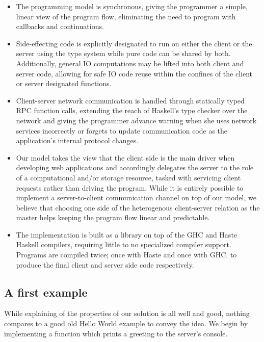 \documentclass[preprint]{sigplanconf}
\begin{document}
\begin{itemize}
  \item The programming model is synchronous, giving the programmer a simple,
        linear view of the program flow, eliminating the need to program with
        callbacks and continuations.
  \item Side-effecting code is explicitly designated to run on either the
        client or the server using the type system while pure code can be
        shared by both. Additionally, general IO computations may be lifted
        into both client and server code, allowing for safe IO code reuse
        within the confines of the client or server designated functions.
  \item Client-server network communication is handled through statically typed
        RPC function calls, extending the reach of Haskell's type checker over
        the network and giving the programmer advance warning when she uses
        network services incorrectly or forgets to update communication code
        as the application's internal protocol changes.
  \item Our model takes the view that the client side is the main driver when
        developing web applications and accordingly delegates the server to
        the role of a computational and/or storage resource, tasked with
        servicing client requests rather than driving the program. While it is
        entirely possible to implement a server-to-client communication channel
        on top of our model, we believe that choosing one side of the
        heterogenous client-server relation as the master helps keeping the
        program flow linear and predictable.
  \item The implementation is built as a library on top of the GHC and Haste
        Haskell compilers, requiring little to no specialized compiler support.
        Programs are compiled twice; once with Haste and once with GHC, to
        produce the final client and server side code respectively.
\end{itemize}

\subsection{A first example}\label{sec:helloserver}

While explaining of the properties of our solution is all well and good,
nothing compares to a good old Hello World example to convey the idea.
We begin by implementing a function which prints a greeting to the server's
console.
\end{document}

